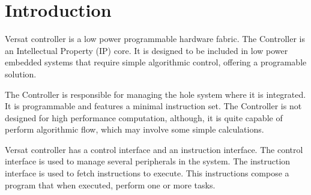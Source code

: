 \section{Introduction}

Versat controller is a low power programmable hardware fabric. The
Controller is an Intellectual Property (IP) core. It is designed to be
included in low power embedded systems that require simple algorithmic
control, offering a programable solution.

The Controller is responsible for managing the hole system where it is
integrated. It is programmable and features a minimal instruction
set. The Controller is not designed for high performance computation,
although, it is quite capable of perform algorithmic flow, which may
involve some simple calculations.

Versat controller has a control interface and an instruction
interface. The control interface is used to manage several peripherals
in the system. The instruction interface is used to fetch instructions
to execute. This instructions compose a program that when executed,
perform one or more tasks.

